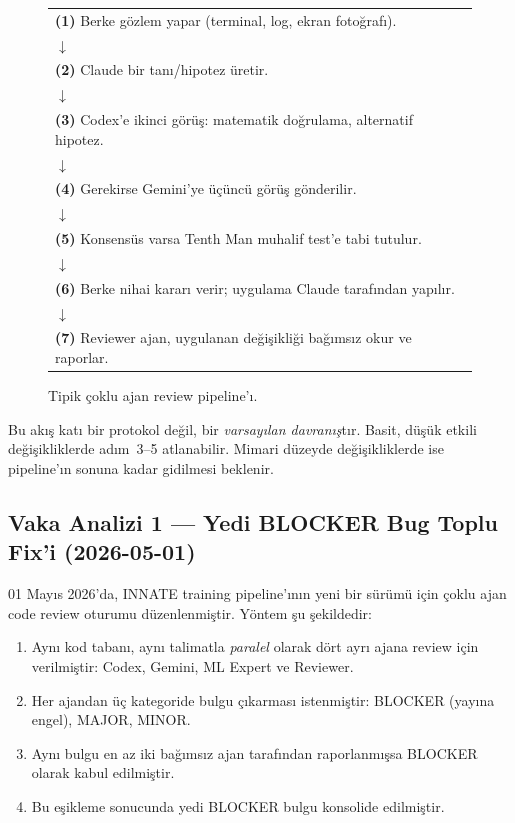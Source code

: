 \begin{figure}[H]
\centering
\begin{tabular}{l}
\textbf{(1)} Berke gözlem yapar (terminal, log, ekran fotoğrafı). \\
\quad $\downarrow$ \\
\textbf{(2)} Claude bir tanı/hipotez üretir. \\
\quad $\downarrow$ \\
\textbf{(3)} Codex'e ikinci görüş: matematik doğrulama, alternatif hipotez. \\
\quad $\downarrow$ \\
\textbf{(4)} Gerekirse Gemini'ye üçüncü görüş gönderilir. \\
\quad $\downarrow$ \\
\textbf{(5)} Konsensüs varsa Tenth Man muhalif test'e tabi tutulur. \\
\quad $\downarrow$ \\
\textbf{(6)} Berke nihai kararı verir; uygulama Claude tarafından yapılır. \\
\quad $\downarrow$ \\
\textbf{(7)} Reviewer ajan, uygulanan değişikliği bağımsız okur ve raporlar. \\
\end{tabular}
\caption{Tipik çoklu ajan review pipeline'ı.}
\label{fig:ma_pipeline_text}
\end{figure}

Bu akış katı bir protokol değil, bir \emph{varsayılan davranış}tır.
Basit, düşük etkili değişikliklerde adım~3--5 atlanabilir. Mimari
düzeyde değişikliklerde ise pipeline'ın sonuna kadar gidilmesi
beklenir.

\subsection{Vaka Analizi 1 — Yedi BLOCKER Bug Toplu Fix'i (2026-05-01)}

01 Mayıs 2026'da, INNATE training pipeline'ının yeni bir sürümü için
çoklu ajan code review oturumu düzenlenmiştir. Yöntem şu şekildedir:

\begin{enumerate}
  \item Aynı kod tabanı, aynı talimatla \emph{paralel} olarak dört
        ayrı ajana review için verilmiştir: Codex, Gemini, ML Expert
        ve Reviewer.
  \item Her ajandan üç kategoride bulgu çıkarması istenmiştir:
        BLOCKER (yayına engel), MAJOR, MINOR.
  \item Aynı bulgu en az iki bağımsız ajan tarafından raporlanmışsa
        BLOCKER olarak kabul edilmiştir.
  \item Bu eşikleme sonucunda yedi BLOCKER bulgu konsolide edilmiştir.
\end{enumerate}

